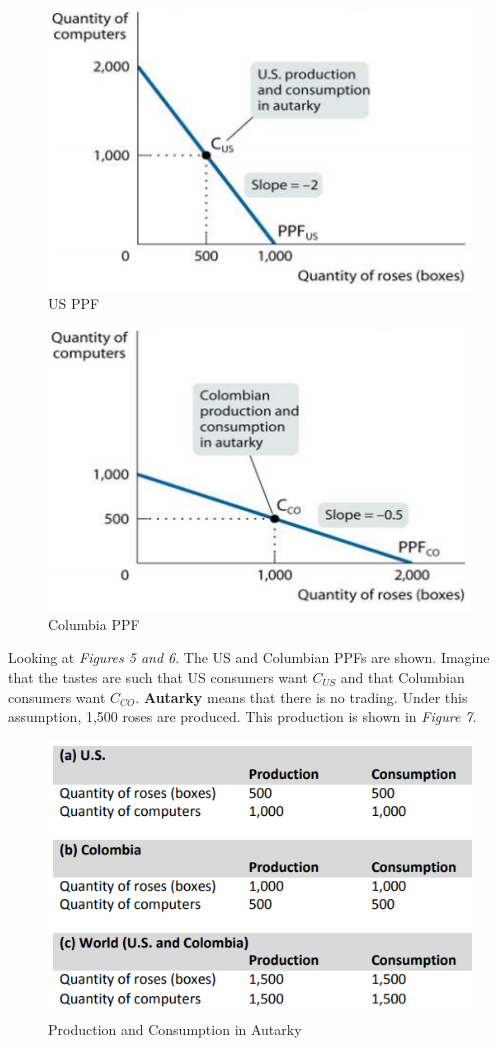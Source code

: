 \documentclass{article}
\begin{document}
\begin{figure}[H]
    \centering
    \includegraphics[scale=1]{"Figure 3a"}
    \caption{US PPF}
\end{figure}

\begin{figure}[H]
    \centering
    \includegraphics[scale=1]{"Figure 3b"}
    \caption{Columbia PPF}
\end{figure}

Looking at \textit{Figures 5 and 6}. The US and Columbian PPFs are shown.
Imagine that the tastes are such that US consumers want $C_{US}$ and that
Columbian consumers want $C_{CO}$. \textbf{Autarky} means that there is no
trading. Under this assumption, 1,500 roses are produced. This production is
shown in \textit{Figure 7}.

\begin{figure}[H]
    \centering
    \includegraphics[scale=0.95]{"Figure 3c"}
    \caption{Production and Consumption in Autarky}
\end{figure}
\end{document}
